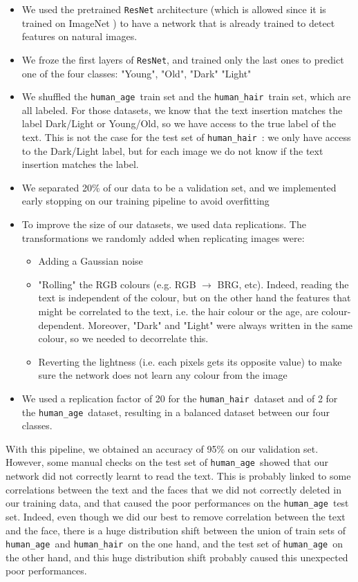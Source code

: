 \documentclass[sigconf, nonacm]{acmart}
\newcommand{\humanAge}{\texttt{human\_age}\ }
\newcommand{\humanHair}{\texttt{human\_hair}\ }
\begin{document}
\begin{itemize}
    \item We used the pretrained \texttt{ResNet} \cite{he_deep_2015} architecture (which is allowed since it is trained on ImageNet \cite{deng_imagenet_2009}) to have a network that is already trained to detect features on natural images.
    \item We froze the first layers of \texttt{ResNet}, and trained only the last ones to predict one of the four classes: "Young", "Old", "Dark" "Light"
    \item We shuffled the \humanAge train set and the \humanHair train set, which are all labeled. For those datasets, we know that the text insertion matches the label Dark/Light or Young/Old, so we have access to the true label of the text. This is not the case for the test set of \humanHair: we only have access to the Dark/Light label, but for each image we do not know if the text insertion matches the label.
    \item We separated 20\% of our data to be a validation set, and we implemented early stopping on our training pipeline to avoid overfitting
    \item To improve the size of our datasets, we used data replications. The transformations we randomly added when replicating images were:
    \begin{itemize}
        \item Adding a Gaussian noise
        \item "Rolling" the RGB colours (e.g. RGB $\rightarrow$ BRG, etc). Indeed, reading the text is independent of the colour, but on the other hand the features that might be correlated to the text, i.e. the hair colour or the age, are colour-dependent. Moreover, "Dark" and "Light" were always written in the same colour, so we needed to decorrelate this.
        \item Reverting the lightness (i.e. each pixels gets its opposite value) to make sure the network does not learn any colour from the image
    \end{itemize}
    \item We used a replication factor of 20 for the \humanHair dataset and of 2 for the \humanAge dataset, resulting in a balanced dataset between our four classes.
\end{itemize}

With this pipeline, we obtained an accuracy of 95\% on our validation set. However, some manual checks on the test set of \humanAge showed that our network did not correctly learnt to read the text. This is probably linked to some correlations between the text and the faces that we did not correctly deleted in our training data, and that caused the poor performances on the \humanAge test set. Indeed, even though we did our best to remove correlation between the text and the face, there is a huge distribution shift between the union of train sets of \humanAge and \humanHair on the one hand, and the test set of \humanAge on the other hand, and this huge distribution shift probably caused this unexpected poor performances.
\end{document}
